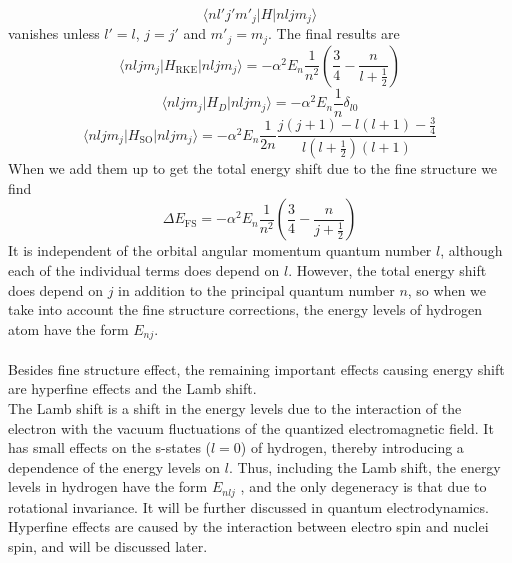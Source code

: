 \documentclass[cyan]{elegantnote}
\begin{document}
\[\langle n l' j' m'_j | H | n l j m_j\rangle\]
vanishes unless $l'=l$, $j=j'$ and $m'_j = m_j$. The final results are
\[\langle n l j m_j | H_{\mathrm{RKE}} | n l j m_j\rangle = -\alpha^2 E_n \frac{1}{n^2} \left(\frac{3}{4} - \frac{n}{l+\frac{1}{2}} \right)\]
\[\langle n l j m_j | H_{D} | n l j m_j\rangle = -\alpha^2 E_n \frac{1}{n}\delta_{l0}\]
\[\langle n l j m_j | H_{\mathrm{SO}} | n l j m_j\rangle = -\alpha^2 E_n \frac{1}{2n} \frac{j(j+1)-l(l+1)-\frac{3}{4}}{l(l+\frac{1}{2})(l+1)}\]
When we add them up to get the total energy shift due to the fine structure we find
\[\Delta E_{\mathrm{FS}} = -\alpha^2 E_n \frac{1}{n^2} \left(\frac{3}{4} - \frac{n}{j+\frac{1}{2}} \right)\]
It is independent of the orbital angular momentum quantum number $l$, although each of the individual terms does depend on $l$. However, the total energy shift does depend on $j$ in addition to the principal quantum number $n$, so when we take into account the fine structure corrections, the energy levels of hydrogen atom have the form $E_{nj}$.\\ \\
Besides fine structure effect, the remaining important effects causing energy shift are hyperfine effects and the Lamb shift.\\
The Lamb shift is a shift in the energy levels due to the interaction of the electron with the vacuum fluctuations of the quantized electromagnetic field. It has small effects on the s-states ($l = 0$) of hydrogen, thereby introducing a dependence of the energy levels on $l$. Thus, including the Lamb shift, the energy levels in hydrogen have the form $E_{nlj}$ , and the only degeneracy is that due to rotational invariance. It will be further discussed in quantum electrodynamics.\\
Hyperfine effects are caused by the interaction between electro spin and nuclei spin, and will be discussed later.
\end{document}
